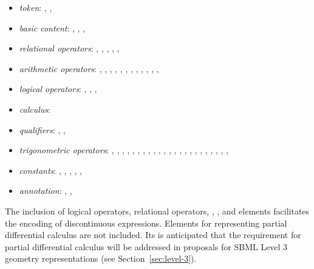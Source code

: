 \documentclass[10pt,twocolumntoc]{cekarticle}
\begin{document}
\begin{itemize}

\item \emph{token}: , , 

\item \emph{basic content}: , ,
, 

\item \emph{relational operators}:
            , , , , , 

\item \emph{arithmetic operators}:
            , , ,
            , , ,
            , , , ,
            , , 

\item \emph{logical operators}:
            , , , 

\item \emph{calculus}:

\item \emph{qualifiers}:
            , , 

\item \emph{trigonometric operators}:
            , , , ,
            , , , ,
            , , ,
            , , ,
            , , , ,
            , , ,
            , , 

\item \emph{constants}:
            , , ,
            , , 

\item \emph{annotation}:
            , ,
\end{itemize}

The inclusion of logical operators, relational operators,
, , and  elements
facilitates the encoding of discontinuous expressions.  Elements for
representing partial differential calculus are not included.  Its is
anticipated that the requirement for partial differential calculus will be
addressed in proposals for SBML Level 3 geometry representations (see
Section~\ref{sec:level-3}).
\end{document}

